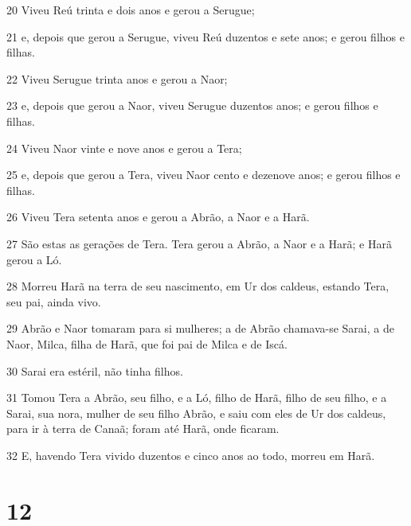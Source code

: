 \par 20 Viveu Reú trinta e dois anos e gerou a Serugue;
\par 21 e, depois que gerou a Serugue, viveu Reú duzentos e sete anos; e gerou filhos e filhas.
\par 22 Viveu Serugue trinta anos e gerou a Naor;
\par 23 e, depois que gerou a Naor, viveu Serugue duzentos anos; e gerou filhos e filhas.
\par 24 Viveu Naor vinte e nove anos e gerou a Tera;
\par 25 e, depois que gerou a Tera, viveu Naor cento e dezenove anos; e gerou filhos e filhas.
\par 26 Viveu Tera setenta anos e gerou a Abrão, a Naor e a Harã.
\par 27 São estas as gerações de Tera. Tera gerou a Abrão, a Naor e a Harã; e Harã gerou a Ló.
\par 28 Morreu Harã na terra de seu nascimento, em Ur dos caldeus, estando Tera, seu pai, ainda vivo.
\par 29 Abrão e Naor tomaram para si mulheres; a de Abrão chamava-se Sarai, a de Naor, Milca, filha de Harã, que foi pai de Milca e de Iscá.
\par 30 Sarai era estéril, não tinha filhos.
\par 31 Tomou Tera a Abrão, seu filho, e a Ló, filho de Harã, filho de seu filho, e a Sarai, sua nora, mulher de seu filho Abrão, e saiu com eles de Ur dos caldeus, para ir à terra de Canaã; foram até Harã, onde ficaram.
\par 32 E, havendo Tera vivido duzentos e cinco anos ao todo, morreu em Harã.

\chapter{12}

